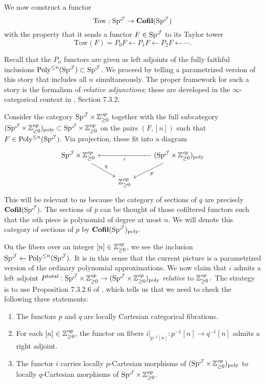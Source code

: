 \begin{cnstr}\label{cnstr:tower}
We now construct a functor $$\text{Tow}: \operatorname{\text{Sp}}^{\operatorname{\mathcal{J}}} \to \operatorname{\textbf{Cofil}}(\operatorname{\text{Sp}}^{\operatorname{\mathcal{J}}})$$ with the property that it sends a functor $F\in \operatorname{\text{Sp}}^{\operatorname{\mathcal{J}}}$ to its Taylor tower $$\text{Tow}(F) = P_0F \longleftarrow P_1F \longleftarrow P_2F \longleftarrow \cdots.$$


Recall that the $P_n$ functors are given as left adjoints of the fully faithful inclusions $\operatorname{\text{Poly}}^{\leq n}(\operatorname{\text{Sp}}^{\operatorname{\mathcal{J}}}) \subset \operatorname{\text{Sp}}^{\operatorname{\mathcal{J}}}$.  We proceed by telling a parametrized version of this story that includes all $n$ simultaneously.  The proper framework for such a story is the formalism of \emph{relative adjunctions}; these are developed in the $\infty$-categorical context in \cite{HA}, Section 7.3.2.  

Consider the category $\operatorname{\text{Sp}}^{\operatorname{\mathcal{J}}}\times \operatorname{\mathbb{Z}}^{op}_{\geq 0}$ together with the full subcategory $(\operatorname{\text{Sp}}^{\operatorname{\mathcal{J}}}\times \operatorname{\mathbb{Z}}^{op}_{\geq 0})_{\text{poly}} \subset \operatorname{\text{Sp}}^{\operatorname{\mathcal{J}}}\times \operatorname{\mathbb{Z}}^{op}_{\geq 0}$ on the pairs $(F, [n])$ such that $F\in \operatorname{\text{Poly}}^{\leq n}(\operatorname{\text{Sp}}^{\operatorname{\mathcal{J}}}).$  Via projection, these fit into a diagram
$$
\begin{tikzcd}\label{dia:reladj}
\Sp^{\J}\times \Z^{op}_{\geq 0} \arrow[rd,"q"]& &(\Sp^{\J}\times \Z^{op}_{\geq 0})_{\text{poly}} \arrow[ld,"p"]\arrow[ll,"i"]  \\
& \Z^{op}_{\geq 0}
\end{tikzcd}
$$
 This will be relevant to us because the category of sections of $q$ are precisely $\operatorname{\textbf{Cofil}}(\operatorname{\text{Sp}}^{\operatorname{\mathcal{J}}}).$  The sections of $p$ can be thought of those cofiltered functors such that the $n$th piece is polynomial of degree at most $n$.  We will denote this category of sections of $p$ by $\operatorname{\textbf{Cofil}}(\operatorname{\text{Sp}}^{\operatorname{\mathcal{J}}})_{\text{poly}}.$ 

On the fibers over an integer $[n] \in \operatorname{\mathbb{Z}}^{op}_{\geq 0}$, we see the inclusion $\operatorname{\text{Sp}}^{\operatorname{\mathcal{J}}} \leftarrow \operatorname{\text{Poly}}^{\leq n}(\operatorname{\text{Sp}}^{\operatorname{\mathcal{J}}}).$  It is in this sense that the current picture is a parametrized version of the ordinary polynomial approximations.  We now claim that $i$ admits a left adjoint $P^{\text{total}}: \operatorname{\text{Sp}}^{\operatorname{\mathcal{J}}}\times \operatorname{\mathbb{Z}}^{op}_{\geq 0} \to (\operatorname{\text{Sp}}^{\operatorname{\mathcal{J}}}\times \operatorname{\mathbb{Z}}^{op}_{\geq 0})_{\text{poly}}$ \emph{relative} to $\operatorname{\mathbb{Z}}^{op}_{\geq 0}.$    The strategy is to use Proposition 7.3.2.6 of \cite{HA}, which tells us that we need to check the following three statements:
\begin{enumerate}
\item The functors $p$ and $q$ are locally Cartesian categorical fibrations.
\item For each $[n]\in \operatorname{\mathbb{Z}}^{op}_{\geq 0}$, the functor on fibers $i|_{p^{-1}[n]}:p^{-1}[n] \to q^{-1}[n]$ admits a right adjoint.  
\item The functor $i$ carries locally $p$-Cartesian morphisms of $(\operatorname{\text{Sp}}^{\operatorname{\mathcal{J}}}\times \operatorname{\mathbb{Z}}^{op}_{\geq 0})_{\text{poly}}$ to locally $q$-Cartesian morphisms of $\operatorname{\text{Sp}}^{\operatorname{\mathcal{J}}}\times \operatorname{\mathbb{Z}}^{op}_{\geq 0}$.
\end{enumerate}


\end{cnstr}
